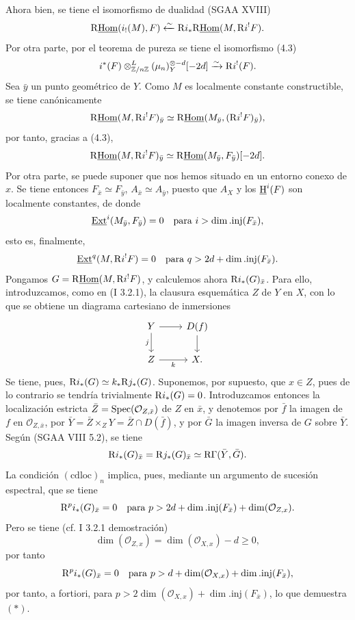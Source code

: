 Ahora bien, se tiene el isomorfismo de dualidad (SGAA XVIII)
\[
        \mathrm{R}\underline{\operatorname{Hom}}(i_!(M),F)\xleftarrow{\sim} \mathrm{R} i_*\mathrm{R}\underline{\operatorname{Hom}}(M,\mathrm{R} i^!F).
\]
Por otra parte, por el teorema de pureza se tiene el isomorfismo (4.3)
\[
        i^*(F)\otimes^L_{\mathbb{Z}/n\mathbb{Z}}(\mu_n)_Y^{\otimes -d}[-2d]\xrightarrow{\sim}\mathrm{R} i^!(F).
\]
Sea $\bar{y}$ un punto geométrico de $Y$. Como $M$ es localmente constante constructible, se tiene canónicamente
\[
        \mathrm{R}\underline{\operatorname{Hom}}(M,\mathrm{R} i^!F)_{\bar{y}}\simeq \mathrm{R}\underline{\operatorname{Hom}}(M_{\bar{y}},(\mathrm{R} i^!F)_{\bar{y}}),
\]
por tanto, gracias a (4.3),
\[
        \mathrm{R}\underline{\operatorname{Hom}}(M,\mathrm{R} i^!F)_{\bar{y}}\simeq \mathrm{R}\underline{\operatorname{Hom}}(M_{\bar{y}},F_{\bar{y}})[-2d].
\]
Por otra parte, se puede suponer que nos hemos situado en un entorno conexo de $x$. Se tiene entonces $F_{\bar{x}}\simeq F_{\bar{y}}$, $A_{\bar{x}}\simeq A_{\bar{y}}$, puesto que $A_X$ y los $\underline{\mathrm H}^i(F)$ son localmente constantes, de donde
\[
        \underline{\operatorname{Ext}}^i(M_{\bar{y}},F_{\bar{y}})=0\quad\hbox{para }i>\dim.\mathrm{inj}(F_{\bar{x}}),
\]
esto es, finalmente,
\[
        \underline{\operatorname{Ext}}^{q}(M,\mathrm{R} i^!F)=0\quad\hbox{para }q>2d+\dim.\mathrm{inj}(F_{\bar{x}}).
\]
Pongamos $G=\mathrm{R}\underline{\operatorname{Hom}}(M,\mathrm{R} i^!F)$, y calculemos ahora $\mathrm{R} i_*(G)_{\bar{x}}$. Para ello, introduzcamos, como en (I 3.2.1), la clausura esquemática $Z$ de $Y$ en $X$, con lo que se obtiene un diagrama cartesiano de inmersiones
\[
\begin{tikzcd}
Y \arrow[r] \arrow[d,"j"'] & D(f) \arrow[d]\\
Z \arrow[r,"k"'] & X.
\end{tikzcd}
\]
Se tiene, pues, $\mathrm{R} i_*(G)\simeq k_*\mathrm{R} j_*(G)$. Suponemos, por supuesto, que $x\in Z$, pues de lo contrario se tendría trivialmente $\mathrm{R} i_*(G)=0$. Introduzcamos entonces la localización estricta $\bar{Z}=\operatorname{Spec}(\mathcal{O}_{Z,\bar{x}})$ de $Z$ en $\bar{x}$, y denotemos por $\bar{f}$ la imagen de $f$ en $\mathcal{O}_{Z,\bar{x}}$, por $\bar{Y}=\bar{Z}\times_ZY=\bar{Z}\cap D(\bar{f})$, y por $\bar{G}$ la imagen inversa de $G$ sobre $\bar{Y}$. Según (SGAA VIII 5.2), se tiene
\[
        \mathrm{R} i_*(G)_{\bar{x}}=\mathrm{R} j_*(G)_{\bar{x}}\simeq \mathrm{R}\Gamma(\bar{Y},\bar{G}).
\]
La condición $(\mathrm{cdloc})_n$ implica, pues, mediante un argumento de sucesión espectral, que se tiene
\[
        \mathrm{R}^p i_*(G)_{\bar{x}}=0\quad\hbox{para }p>2d+\dim.\mathrm{inj}(F_{\bar{x}})+\dim(\mathcal{O}_{Z,x}).
\]
Pero se tiene (cf. I 3.2.1 demostración)
\[
        \dim(\mathcal{O}_{Z,x})=\dim(\mathcal{O}_{X,x})-d\geq0,
\]
por tanto
\[
        \mathrm{R}^p i_*(G)_{\bar{x}}=0\quad\hbox{para }p>d+\dim(\mathcal{O}_{X,x})+\dim.\mathrm{inj}(F_{\bar{x}}),
\]
por tanto, a fortiori, para $p>2\dim(\mathcal{O}_{X,x})+\dim.\mathrm{inj}(F_{\bar{x}})$, lo que demuestra $(*)$.

